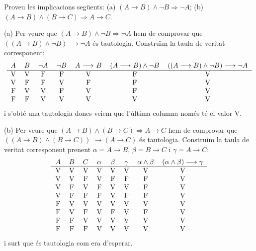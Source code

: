 \begin{exercici}
Proveu les implicacions seg\"{u}ents: (a) $(A\longrightarrow B)\wedge\lnot
B\Longrightarrow\lnot A$; (b) $\left(  A\longrightarrow B\right)
\wedge\left(  B\longrightarrow C\right)  \Longrightarrow A\longrightarrow C$.
\end{exercici}

\begin{solucio}
(a) Per veure que $(A\longrightarrow B)\wedge\lnot B\Longrightarrow\lnot A$
hem de comprovar que $\left(  (A\longrightarrow B)\wedge\lnot B\right)  $
$\longrightarrow\lnot A$ \'{e}s tautologia. Constru\"{\i}m la taula de veritat
corresponent:%
\[%
\begin{tabular}
[c]{ccccccc}%
$A$ & $B$ & $\lnot A$ & $\lnot B$ & $A$ $\longrightarrow$ $B$ &
$(A\longrightarrow B)\wedge\lnot B$ & $\left(  (A\longrightarrow B)\wedge\lnot
B\right)  $ $\longrightarrow\lnot A$\\\hline
V & V & F & F & V & F & V\\
V & F & F & V & F & F & V\\
F & V & V & F & V & F & V\\
F & F & V & V & V & V & V
\end{tabular}
\]
i s'obt\'{e} una tautologia doncs veiem que l'\'{u}ltima columna nom\'{e}s
t\'{e} el valor V.

(b) Per veure que $\left(  A\longrightarrow B\right)  \wedge\left(
B\longrightarrow C\right)  \Longrightarrow A\longrightarrow C$ hem de
comprovar que $\left(  \left(  A\longrightarrow B\right)  \wedge\left(
B\longrightarrow C\right)  \right)  $ $\longrightarrow\left(  A\longrightarrow
C\right)  $ \'{e}s tautologia. Constru\"{\i}m la taula de veritat corresponent
prenent $\alpha=A\longrightarrow B$, $\beta=B\longrightarrow C $ i
$\gamma=A\longrightarrow C$:%
\[%
\begin{tabular}
[c]{cccccccc}%
$A$ & $B$ & $C$ & $\alpha$ & $\beta$ & $\gamma$ & $\alpha\wedge\beta$ &
$\left(  \alpha\wedge\beta\right)  \longrightarrow\gamma$\\\hline
V & V & V & V & V & V & V & V\\
V & V & F & V & F & F & F & V\\
V & F & V & F & V & V & F & V\\
V & F & F & F & V & F & F & V\\
F & V & V & V & V & V & V & V\\
F & V & F & V & F & V & F & V\\
F & F & V & V & V & V & V & V\\
F & F & F & V & V & V & V & V
\end{tabular}
\]
i surt que \'{e}s tautologia com era d'esperar.
\end{solucio}

